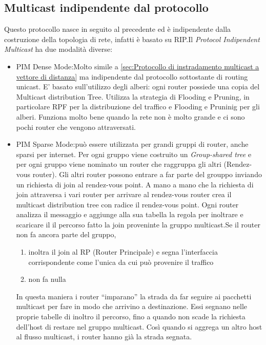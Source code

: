 \subsection{Multicast indipendente dal protocollo}
Questo protocollo nasce in seguito al precedente ed è indipendente dalla costruzione della topologia di rete, infatti è basato su RIP.Il \textit{Protocol Indipendent Multicast} ha due modalità diverse:
\begin{itemize}
  \item PIM Dense Mode:Molto simile a \ref{sec:Protocollo di instradamento multicast a vettore di distanza} ma indipendente dal protocollo sottostante di routing unicast. E' basato sull'utilizzo degli alberi: ogni router possiede una copia del Multicast distribution Tree. Utilizza la strategia di Flooding e Pruning, in particolare RPF per la distribuzione del traffico e Flooding e Pruninig per gli alberi. Funziona molto bene quando la rete non è molto grande e ci sono pochi router che vengono attraversati.
  \item PIM Sparse Mode:può essere utilizzata per grandi gruppi di router, anche sparsi per internet. Per ogni gruppo viene costruito un \textit{Group-shared tree} e per ogni gruppo viene nominato un router che raggruppa gli altri (Rendez-vous router). Gli altri router possono entrare a far parte del grouppo inviando un richiesta di join al rendez-vous point. A mano a mano che la richiesta di join attraversa i vari router per arrivare al rendez-vous router crea il multicast distribution tree con radice il rendez-vous point. Ogni router analizza il messaggio e aggiunge alla sua tabella la regola per inoltrare e scaricare il il percorso fatto la join proveninte la gruppo multicast.Se il router non fa ancora parte del gruppo,
        \begin{enumerate}
          \item inoltra il join al RP (Router Principale) e segna l'interfaccia corrispondente come l'unica da cui può provenire il traffico
          \item non fa nulla
        \end{enumerate}
    In questa maniera i router “imparano” la strada da far seguire ai pacchetti multicast per fare in modo che arrivino a destinazione. Essi segnano nelle proprie tabelle di inoltro il percorso, fino a quando non scade la richiesta dell’host di restare nel gruppo multicast. Così quando si aggrega un altro host al flusso multicast, i router hanno già la strada segnata.
\end{itemize}
